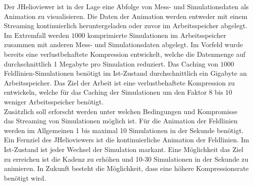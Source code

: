 Der JHelioviewer ist in der Lage eine Abfolge von Mess- und Simulationsdaten als Animation zu visualisieren. Die Daten der Animation werden entweder mit einem Streaming kontinuierlich heruntergeladen oder zuvor im Arbeitsspeicher abgelegt. Im Extremfall werden $1000$ komprimierte Simulationen im Arbeitsspeicher zusammen mit anderen Mess- und Simulationsdaten abgelegt. Im Vorfeld wurde bereits eine verlustbehaftete Kompression entwickelt, welche die Datenmenge auf durchschnittlich 1 Megabyte pro Simulation reduziert. Das Caching von $1000$ Feldlinien-Simulationen benötigt im Ist-Zustand durchschnittlich ein Gigabyte an Arbeitsspeicher. Das Ziel der Arbeit ist eine verlustbehaftete Kompression zu entwickeln, welche für das Caching der Simulationen um den Faktor $8$ bis $10$ weniger Arbeitsspeicher benötigt.\\
Zusätzlich soll erforscht werden unter welchen Bedingungen und Kompromisse das Streaming von Simulationen möglich ist. Für die Animation der Feldlinien werden im Allgemeinen 1 bis maximal 10 Simulationen in der Sekunde benötigt. Ein Fernziel des JHelioviewers ist die kontinuierliche Animation der Feldlinien. Im Ist-Zustand ist jeder Wechsel der Simulation markant. Eine Möglichkeit das Ziel zu erreichen ist die Kadenz zu erhöhen und 10-30 Simulationen in der Sekunde zu animieren. In Zukunft besteht die Möglichkeit, dass eine höhere Kompressionsrate benötigt wird.

